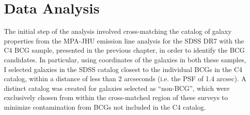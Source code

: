\newpage
\section{Data Analysis}
The initial step of the analysis involved cross-matching the catalog of galaxy properties from the MPA-JHU emission line analysis for the SDSS DR7 with the C4 BCG sample, presented in the previous chapter, in order to identify the BCG candidates. In particular, using coordinates of the galaxies in both these samples, I selected galaxies in the SDSS catalog closest to the individual BCGs in the C4 catalog, within a distance of less than 2 arcseconds (i.e. the PSF of 1.4 arcsec). 
A distinct catalog was created for galaxies selected as “non-BCG”, which were exclusively chosen from within the cross-matched region of these surveys to minimize contamination from BCGs not included in the C4 catalog. 

